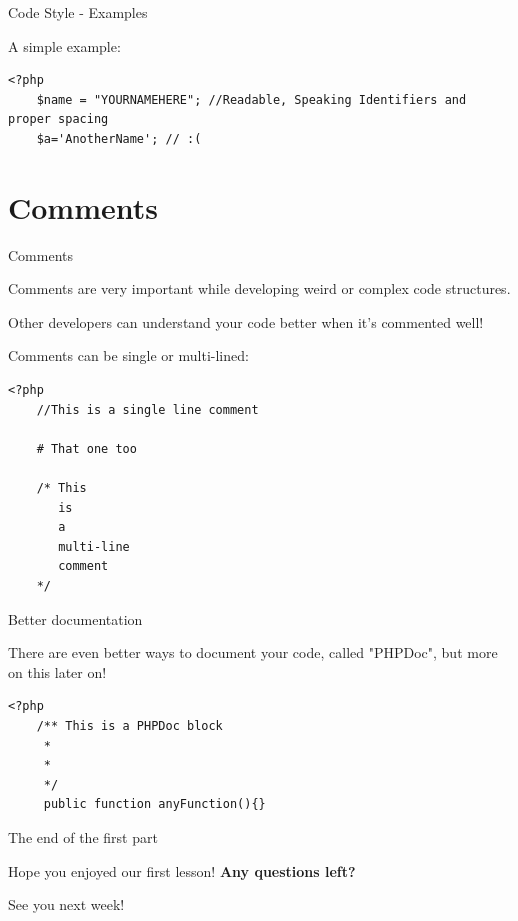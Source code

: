 \begin{frame}[fragile]{Code Style - Examples}

A simple example:

\begin{lstlisting}
<?php
	$name = "YOURNAMEHERE"; //Readable, Speaking Identifiers and proper spacing
	$a='AnotherName'; // :(
	\end{lstlisting}

\end{frame}

\section{Comments}

\begin{frame}[fragile]{Comments}

Comments are very important while developing weird or complex code structures. \pause

Other developers can understand your code better when it's commented well! 
\pause

Comments can be single or multi-lined:

	\begin{lstlisting}
<?php
	//This is a single line comment
	
	# That one too
	
	/* This
	   is
	   a
	   multi-line
	   comment
	*/
	\end{lstlisting}

\end{frame}

\begin{frame}[fragile]{Better documentation}

There are even better ways to document your code, called "PHPDoc", but more on this later on!
	\begin{lstlisting}
<?php
	/** This is a PHPDoc block
	 *
	 *
	 */
	 public function anyFunction(){}
	\end{lstlisting}

\end{frame}

\begin{frame}[fragile]{The end of the first part}

Hope you enjoyed our first lesson! \textbf{Any questions left?} \pause

See you next week!

\end{frame}





